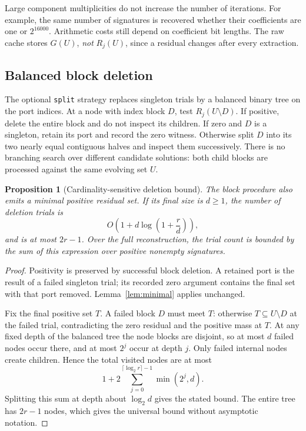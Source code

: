 \documentclass[11pt,letterpaper]{article}
\newtheorem{proposition}[theorem]{Proposition}
\theoremstyle{definition}\newtheorem{definition}[theorem]{Definition}
\theoremstyle{remark}\newtheorem{remark}[theorem]{Remark}
\newcommand{\api}[1]{\texttt{#1}}
\begin{document}
Large component multiplicities do not increase the number of iterations. For example, the same number of signatures is recovered whether their coefficients are one or $2^{16000}$. Arithmetic costs still depend on coefficient bit lengths. The raw cache stores $G(U)$, \emph{not} $R_j(U)$, since a residual changes after every extraction.

\subsection{Balanced block deletion}
\label{sec:split}

The optional \api{split} strategy replaces singleton trials by a balanced binary tree on the port indices. At a node with index block $D$, test $R_j(U\setminus D)$. If positive, delete the entire block and do not inspect its children. If zero and $D$ is a singleton, retain its port and record the zero witness. Otherwise split $D$ into its two nearly equal contiguous halves and inspect them successively. There is no branching search over different candidate solutions: both child blocks are processed against the same evolving set $U$.

\begin{proposition}[Cardinality-sensitive deletion bound]
\label{prop:split}
The block procedure also emits a minimal positive residual set. If its final size is $d\ge1$, the number of deletion trials is
\[
O\!\left(1+d\log\left(1+\frac rd\right)\right),
\]
and is at most $2r-1$. Over the full reconstruction, the trial count is bounded by the sum of this expression over positive nonempty signatures.
\end{proposition}
\begin{proof}
Positivity is preserved by successful block deletion. A retained port is the result of a failed singleton trial; its recorded zero argument contains the final set with that port removed. Lemma~\ref{lem:minimal} applies unchanged.

Fix the final positive set $T$. A failed block $D$ must meet $T$: otherwise $T\subseteq U\setminus D$ at the failed trial, contradicting the zero residual and the positive mass at $T$. At any fixed depth of the balanced tree the node blocks are disjoint, so at most $d$ failed nodes occur there, and at most $2^j$ occur at depth $j$. Only failed internal nodes create children. Hence the total visited nodes are at most
\[
1+2\sum_{j=0}^{\lceil\log_2 r\rceil-1}\min(2^j,d).
\]
Splitting this sum at depth about $\log_2 d$ gives the stated bound. The entire tree has $2r-1$ nodes, which gives the universal bound without asymptotic notation.
\end{proof}
\end{document}
